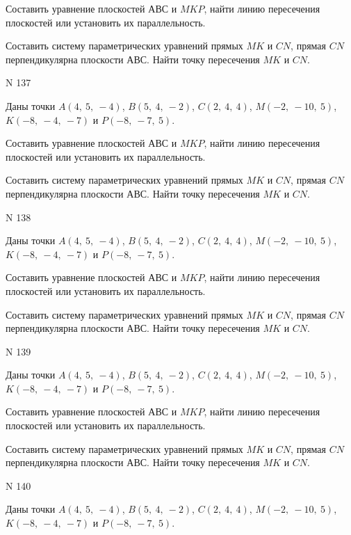 \documentclass[11pt]{report}
\begin{document}
Составить уравнение плоскостей $АВС$ и $MKP$,
найти линию пересечения плоскостей или установить их параллельность.

Составить систему параметрических уравнений прямых $MK$ и $CN$,
прямая $CN$ перпендикулярна плоскости $АВС$. 
Найти точку пересечения $MK$ и $CN$.



 N 137

Даны точки $A\left( 4, \  5, \  -4\right)$, $B\left( 5, \  4, \  -2\right)$, $C\left( 2, \  4, \  4\right)$, $M\left( -2, \  -10, \  5\right)$, $K\left( -8, \  -4, \  -7\right)$ и $P\left( -8, \  -7, \  5\right)$.


Составить уравнение плоскостей $АВС$ и $MKP$,
найти линию пересечения плоскостей или установить их параллельность.

Составить систему параметрических уравнений прямых $MK$ и $CN$,
прямая $CN$ перпендикулярна плоскости $АВС$. 
Найти точку пересечения $MK$ и $CN$.



 N 138

Даны точки $A\left( 4, \  5, \  -4\right)$, $B\left( 5, \  4, \  -2\right)$, $C\left( 2, \  4, \  4\right)$, $M\left( -2, \  -10, \  5\right)$, $K\left( -8, \  -4, \  -7\right)$ и $P\left( -8, \  -7, \  5\right)$.


Составить уравнение плоскостей $АВС$ и $MKP$,
найти линию пересечения плоскостей или установить их параллельность.

Составить систему параметрических уравнений прямых $MK$ и $CN$,
прямая $CN$ перпендикулярна плоскости $АВС$. 
Найти точку пересечения $MK$ и $CN$.



 N 139

Даны точки $A\left( 4, \  5, \  -4\right)$, $B\left( 5, \  4, \  -2\right)$, $C\left( 2, \  4, \  4\right)$, $M\left( -2, \  -10, \  5\right)$, $K\left( -8, \  -4, \  -7\right)$ и $P\left( -8, \  -7, \  5\right)$.


Составить уравнение плоскостей $АВС$ и $MKP$,
найти линию пересечения плоскостей или установить их параллельность.

Составить систему параметрических уравнений прямых $MK$ и $CN$,
прямая $CN$ перпендикулярна плоскости $АВС$. 
Найти точку пересечения $MK$ и $CN$.



 N 140

Даны точки $A\left( 4, \  5, \  -4\right)$, $B\left( 5, \  4, \  -2\right)$, $C\left( 2, \  4, \  4\right)$, $M\left( -2, \  -10, \  5\right)$, $K\left( -8, \  -4, \  -7\right)$ и $P\left( -8, \  -7, \  5\right)$.
\end{document}

